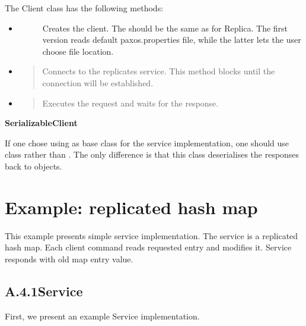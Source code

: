 The Client class has the following methods:
\begin{itemize}
\item {} \begin{description}
\item[{}]
\item[] \hfill

Creates the client. The  should be the same as for Replica. The first version reads default paxos.properties file, while the latter lets the user choose file location.

\end{description}

\item {} 
\begin{quote}

Connects to the replicates service. This method blocks until the connection will be established.
\end{quote}

\item {} 
\begin{quote}

Executes the request and waits for the response.
\end{quote}

\end{itemize}

\textbf{SerializableClient}

If one chose using  as base class for the service implementation, one should use class  rather than . The only difference is that this class deserialises the responses back to objects.


\section{Example: replicated hash map}
\label{example::doc}\label{example:example-replicated-hash-map}
This example presents simple service implementation. The service is a replicated hash map. Each client command reads requested entry and modifies it. Service responds with old map entry value.


\subsection*{A.4.1\quad Service}
\label{example:service}
First, we present an example Service implementation.

